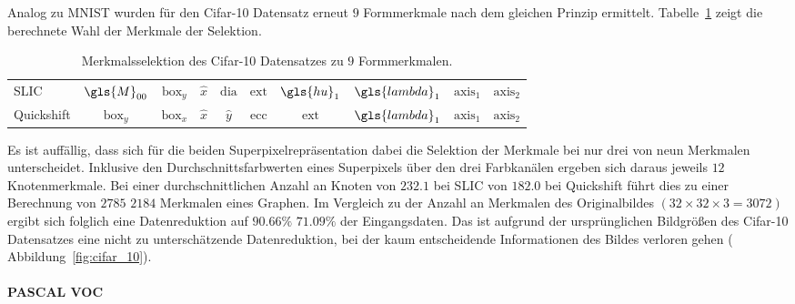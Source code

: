 Analog zu \gls{MNIST} wurden für den \gls{Cifar}-10 Datensatz erneut $9$ Formmerkmale nach dem gleichen Prinzip ermittelt.
Tabelle~\ref{tab:cifar_10_merkmale} zeigt die berechnete Wahl der Merkmale der Selektion.
\begin{table}[t]
\centering
\begin{tabular}{lccccccccc}
  \toprule
  \gls{SLIC} & $\gls{M}_{00}$ & $\mathrm{box}_y$ & $\hat x$ & $\mathrm{dia}$ & $\mathrm{ext}$ & $\gls{hu}_1$ & $\gls{lambda}_1$ & $\mathrm{axis}_1$ & $\mathrm{axis}_2$\\
  Quickshift & $\mathrm{box}_y$ & $\mathrm{box}_x$ & $\hat x$ & $\hat y$ & $\mathrm{ecc}$ & $\mathrm{ext}$ & $\gls{lambda}_1$ & $\mathrm{axis}_1$ & $\mathrm{axis}_2$\\
  \bottomrule
\end{tabular}
  \caption[\gls{Cifar}-10 Merkmalsselektion]{Merkmalsselektion des \gls{Cifar}-10 Datensatzes zu $9$ Formmerkmalen.}
\label{tab:cifar_10_merkmale}
\end{table}
Es ist auffällig, dass sich für die beiden Superpixelrepräsentation dabei die Selektion der Merkmale bei nur drei von neun Merkmalen unterscheidet.
Inklusive den Durchschnittsfarbwerten eines Superpixels über den drei Farbkanälen ergeben sich daraus jeweils $12$ Knotenmerkmale.
Bei einer durchschnittlichen Anzahl an Knoten von $232.1$ bei \gls{SLIC} \bzw{} von $182.0$ bei Quickshift führt dies zu einer Berechnung von $2785$ \bzw{} $2184$ Merkmalen eines Graphen.
Im Vergleich zu der Anzahl an Merkmalen des Originalbildes $\left(32 \times 32 \times 3 = 3072\right)$ ergibt sich folglich eine Datenreduktion auf $90.66\%$ \bzw{} $71.09\%$ der Eingangsdaten.
Das ist aufgrund der ursprünglichen Bildgrößen des \gls{Cifar}-10 Datensatzes eine nicht zu unterschätzende Datenreduktion, bei der kaum entscheidende Informationen des Bildes verloren gehen (\vgl{} Abbildung~\ref{fig:cifar_10}).

\paragraph{PASCAL VOC}
\label{pascal_voc}

